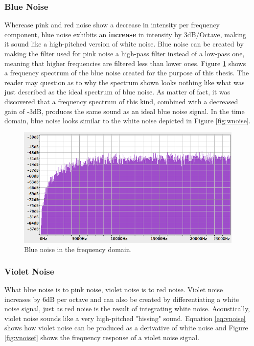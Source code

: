 \documentclass[12pt,twoside]{report}
\begin{document}
\subsubsection{Blue Noise}

Wherease pink and red noise show a decrease in intensity per frequency component, blue noise exhibits an \textbf{increase} in intensity by 3dB/Octave, making it sound like a high-pitched version of white noise. Blue noise can be created by making the filter used for pink noise a high-pass filter instead of a low-pass one, meaning that higher frequencies are filtered less than lower ones. Figure \ref{fig:bnoisef} shows a frequency spectrum of the blue noise created for the purpose of this thesis. The reader may question as to why the spectrum shown looks nothing like what was just described as the ideal spectrum of blue noise. As matter of fact, it was discovered that a frequency spectrum of this kind, combined with a decreased gain of -3dB, produces the same sound as an ideal blue noise signal. In the time domain, blue noise looks similar to the white noise depicted in Figure \ref{fig:wnoise}.

\begin{figure}[hb!]
  \includegraphics[scale=0.6]{img/bnoisef}
  \caption{Blue noise in the frequency domain.}
  \label{fig:bnoisef}
\end{figure}

\pagebreak

\subsubsection{Violet Noise}

What blue noise is to pink noise, violet noise is to red noise. Violet noise increases by 6dB per octave and can also be created by differentiating a white noise signal, just as red noise is the result of integrating white noise. Acoustically, violet noise sounds like a very high-pitched "hissing" sound. Equation \ref{eq:vnoise} shows how violet noise can be produced as a derivative of white noise and Figure \ref{fig:vnoisef} shows the frequency response of a violet noise signal.
\end{document}
